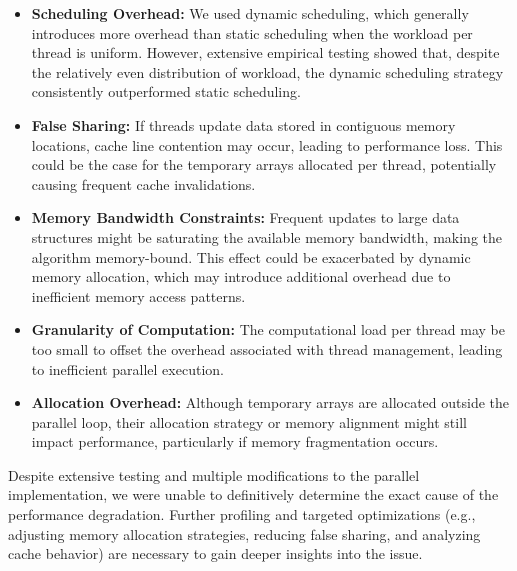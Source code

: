\begin{itemize}
    \item \textbf{Scheduling Overhead:} We used dynamic scheduling, which generally introduces more overhead than static scheduling when the workload per thread is uniform. However, extensive empirical testing showed that, despite the relatively even distribution of workload, the dynamic scheduling strategy consistently outperformed static scheduling.

    \item \textbf{False Sharing:} If threads update data stored in contiguous memory locations, cache line contention may occur, leading to performance loss. This could be the case for the temporary arrays allocated per thread, potentially causing frequent cache invalidations.

    \item \textbf{Memory Bandwidth Constraints:} Frequent updates to large data structures might be saturating the available memory bandwidth, making the algorithm memory-bound. This effect could be exacerbated by dynamic memory allocation, which may introduce additional overhead due to inefficient memory access patterns.

    \item \textbf{Granularity of Computation:} The computational load per thread may be too small to offset the overhead associated with thread management, leading to inefficient parallel execution.

    \item \textbf{Allocation Overhead:} Although temporary arrays are allocated outside the parallel loop, their allocation strategy or memory alignment might still impact performance, particularly if memory fragmentation occurs.
\end{itemize}

Despite extensive testing and multiple modifications to the parallel implementation, we were unable to definitively determine the exact cause of the performance degradation. Further profiling and targeted optimizations (e.g., adjusting memory allocation strategies, reducing false sharing, and analyzing cache behavior) are necessary to gain deeper insights into the issue.
